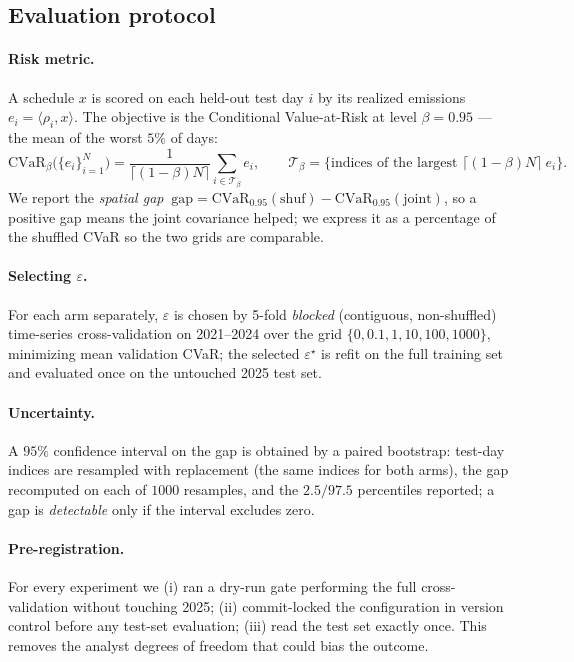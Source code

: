 \documentclass[11pt]{article}
\newcommand{\CVaR}{\mathrm{CVaR}}
\begin{document}
\subsection{Evaluation protocol}
\paragraph{Risk metric.} A schedule $x$ is scored on each held-out test day $i$ by its realized
emissions $e_i=\langle\rho_i,x\rangle$. The objective is the Conditional Value-at-Risk at level
$\beta=0.95$ --- the mean of the worst $5\%$ of days:
\begin{equation}
  \CVaR_{\beta}\big(\{e_i\}_{i=1}^{N}\big)=\frac{1}{\lceil(1-\beta)N\rceil}\sum_{i\in\mathcal{T}_\beta}e_i,
  \qquad \mathcal{T}_\beta=\{\text{indices of the largest }\lceil(1-\beta)N\rceil\ e_i\}.
  \label{eq:cvar}
\end{equation}
We report the \emph{spatial gap}
$\ \mathrm{gap}=\CVaR_{0.95}(\mathrm{shuf})-\CVaR_{0.95}(\mathrm{joint})$,
so a positive gap means the joint covariance helped; we express it as a percentage of the shuffled CVaR
so the two grids are comparable.

\paragraph{Selecting $\varepsilon$.} For each arm separately, $\varepsilon$ is chosen by 5-fold
\emph{blocked} (contiguous, non-shuffled) time-series cross-validation on 2021--2024 over the grid
$\{0,0.1,1,10,100,1000\}$, minimizing mean validation CVaR; the selected $\varepsilon^\star$ is refit on
the full training set and evaluated once on the untouched 2025 test set.

\paragraph{Uncertainty.} A $95\%$ confidence interval on the gap is obtained by a paired bootstrap:
test-day indices are resampled with replacement (the same indices for both arms), the gap recomputed on
each of $1000$ resamples, and the $2.5/97.5$ percentiles reported; a gap is \emph{detectable} only if
the interval excludes zero.

\paragraph{Pre-registration.} For every experiment we (i) ran a dry-run gate performing the full
cross-validation without touching 2025; (ii) commit-locked the configuration in version control before
any test-set evaluation; (iii) read the test set exactly once. This removes the analyst degrees of
freedom that could bias the outcome.
\end{document}
